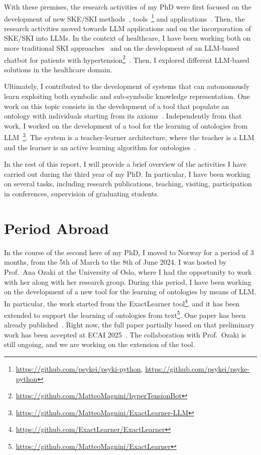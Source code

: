 \documentclass[11pt]{article}
\begin{document}
With these premises, the research activities of my PhD were first focused on the development of new \gls{SKE}/\gls{SKI} methods~\cite{DBLP:journals/logcom/MagniniCO23,DBLP:conf/woa/MagniniCO22,DBLP:conf/cilc/MagniniCO22}, tools~\cite{DBLP:conf/atal/MagniniCO22}\footnote{\url{https://github.com/psykei/psyki-python}, \url{https://github.com/psykei/psyke-python}} and applications~\cite{DBLP:journals/cmpb/MagniniCCAO23,DBLP:conf/extraamas/CiattoMBAO23}.
%
Then, the research activities moved towards \gls{LLM} applications and on the incorporation of \gls{SKE}/\gls{SKI} into \glspl{LLM}.
%
In the context of healthcare, I have been working both on more traditional \gls{SKI} approaches~\cite{DBLP:conf/hc/Magnini24} and on the development of an \gls{LLM}-based chatbot for patients with hypertension\footnote{\url{https://github.com/MatteoMagnini/hyperTensionBot}}~\cite{DBLP:conf/percom/MontagnaAFPKUM24}.
%
Then, I explored different \gls{LLM}-based solutions in the healthcare domain.


Ultimately, I contributed to the development of systems that can autonomously learn exploiting both symbolic and sub-symbolic knowledge representation.
%
One work on this topic consists in the development of a tool that populate an ontology with individuals starting from its axioms~\cite{DBLP:journals/kbs/CiattoAMO25}.
%
Independently from that work, I worked on the development of a tool for the learning of ontologies from \gls{LLM}~\cite{DBLP:conf/dlog/MagniniOS24}\footnote{\url{https://github.com/MatteoMagnini/ExactLearner-LLM}}.
%
The system is a teacher-learner architecture, where the teacher is a \gls{LLM} and the learner is an active learning algorithm for ontologies~\cite{Magnini2025ActivelyLearning}.
%

In the rest of this report, I will provide a brief overview of the activities I have carried out during the third year of my PhD\@.
%
In particular, I have been working on several tasks, including research publications, teaching, visiting, participation in conferences, supervision of graduating students.


\section{Period Abroad}\label{sec:period-abroad}
%
In the course of the second here of my PhD, I moved to Norway for a period of 3 months, from the 5th of March to the 8th of June 2024.
%
I was hosted by Prof.~Ana Ozaki at the University of Oslo, where I had the opportunity to work with her along with her research group.
%
During this period, I have been working on the development of a new tool for the learning of ontologies by means of \gls{LLM}.
%
In particular, the work started from the ExactLearner tool\footnote{\url{https://github.com/ExactLearner/ExactLearner}}, and it has been extended to support the learning of ontologies from text\footnote{\url{https://github.com/MatteoMagnini/ExactLearner}}.
%
One paper has been already published~\cite{DBLP:conf/dlog/MagniniOS24}.
%
Right now, the full paper partially based on that preliminary work has been accepted at ECAI 2025~\cite{DBLP:conf/dlog/MagniniOS24}.
%
The collaboration with Prof.~Ozaki is still ongoing, and we are working on the extension of the tool.
\end{document}
